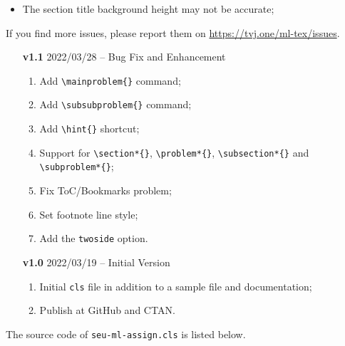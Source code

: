 \documentclass[oneside]{seu-ml-assign}
\renewcommand{\sectionheadname}{Section}
\begin{document}
  \appendix
  \renewcommand{\sectionheadname}{Appendix}

  \label{sec:known_issues}

    \begin{itemize}
      \item The section title background height may not be accurate;
    \end{itemize}

    If you find more issues, please report them on \url{https://tvj.one/ml-tex/issues}.


    \begin{multicols}{2}
      \begin{itemize}
        \item [\textbf{v1.1}] 2022/03/28 -- Bug Fix and Enhancement
          \begin{enumerate}
            \item Add \verb|\mainproblem{}| command;
            \item Add \verb|\subsubproblem{}| command;
            \item Add \verb|\hint{}| shortcut;
            \item Support for \verb|\section*{}|, \verb|\problem*{}|, \verb|\subsection*{}| and \verb|\subproblem*{}|;
            \item Fix ToC/Bookmarks problem;
            \item Set footnote line style;
            \item Add the \texttt{twoside} option.
          \end{enumerate}
        \item [\textbf{v1.0}] 2022/03/19 -- Initial Version
          \begin{enumerate}
            \item Initial \texttt{cls} file in addition to a sample file and documentation;
            \item Publish at GitHub and CTAN.
          \end{enumerate}
      \end{itemize}
    \end{multicols}


    The source code of \texttt{seu-ml-assign.cls} is listed below.

    
\end{document}
